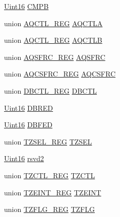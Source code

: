 \begin{DoxyCompactItemize}
\item 
\hyperlink{_d_s_p2833x___device_8h_a59a9f6be4562c327cbfb4f7e8e18f08b}{Uint16} \hyperlink{struct_e_p_w_m___r_e_g_s_a38259b83d1f022159dfc124d1c037073}{C\+M\+P\+B}
\item 
union \hyperlink{union_a_q_c_t_l___r_e_g}{A\+Q\+C\+T\+L\+\_\+\+R\+E\+G} \hyperlink{struct_e_p_w_m___r_e_g_s_ad62b625c7b2752962f3a2e2ab0f65976}{A\+Q\+C\+T\+L\+A}
\item 
union \hyperlink{union_a_q_c_t_l___r_e_g}{A\+Q\+C\+T\+L\+\_\+\+R\+E\+G} \hyperlink{struct_e_p_w_m___r_e_g_s_ac38b43b3052965958878810a3b82b192}{A\+Q\+C\+T\+L\+B}
\item 
union \hyperlink{union_a_q_s_f_r_c___r_e_g}{A\+Q\+S\+F\+R\+C\+\_\+\+R\+E\+G} \hyperlink{struct_e_p_w_m___r_e_g_s_aaed317734280c0c7655016d6f4e0ec75}{A\+Q\+S\+F\+R\+C}
\item 
union \hyperlink{union_a_q_c_s_f_r_c___r_e_g}{A\+Q\+C\+S\+F\+R\+C\+\_\+\+R\+E\+G} \hyperlink{struct_e_p_w_m___r_e_g_s_a72396e1c5f1dec68cda2da214766b8af}{A\+Q\+C\+S\+F\+R\+C}
\item 
union \hyperlink{union_d_b_c_t_l___r_e_g}{D\+B\+C\+T\+L\+\_\+\+R\+E\+G} \hyperlink{struct_e_p_w_m___r_e_g_s_a9e10c95155ba8de962224b39f4bf93b6}{D\+B\+C\+T\+L}
\item 
\hyperlink{_d_s_p2833x___device_8h_a59a9f6be4562c327cbfb4f7e8e18f08b}{Uint16} \hyperlink{struct_e_p_w_m___r_e_g_s_ae3625c046423d70b9e00ea782b2d4daf}{D\+B\+R\+E\+D}
\item 
\hyperlink{_d_s_p2833x___device_8h_a59a9f6be4562c327cbfb4f7e8e18f08b}{Uint16} \hyperlink{struct_e_p_w_m___r_e_g_s_a0b5c959707b9eb0c393dd1cb5b5ec59a}{D\+B\+F\+E\+D}
\item 
union \hyperlink{union_t_z_s_e_l___r_e_g}{T\+Z\+S\+E\+L\+\_\+\+R\+E\+G} \hyperlink{struct_e_p_w_m___r_e_g_s_a8cef159efb9754bf2471b656af814161}{T\+Z\+S\+E\+L}
\item 
\hyperlink{_d_s_p2833x___device_8h_a59a9f6be4562c327cbfb4f7e8e18f08b}{Uint16} \hyperlink{struct_e_p_w_m___r_e_g_s_af1f378518c71cbdee929a64e5677a016}{rsvd2}
\item 
union \hyperlink{union_t_z_c_t_l___r_e_g}{T\+Z\+C\+T\+L\+\_\+\+R\+E\+G} \hyperlink{struct_e_p_w_m___r_e_g_s_a65fc11f25f4a8e966702dcacb6e81a13}{T\+Z\+C\+T\+L}
\item 
union \hyperlink{union_t_z_e_i_n_t___r_e_g}{T\+Z\+E\+I\+N\+T\+\_\+\+R\+E\+G} \hyperlink{struct_e_p_w_m___r_e_g_s_a39cd5641cbb06b92e9647dadfdc60024}{T\+Z\+E\+I\+N\+T}
\item 
union \hyperlink{union_t_z_f_l_g___r_e_g}{T\+Z\+F\+L\+G\+\_\+\+R\+E\+G} \hyperlink{struct_e_p_w_m___r_e_g_s_af209cbb6b99dbb580cf0fc8787bd18b9}{T\+Z\+F\+L\+G}

\end{DoxyCompactItemize}
